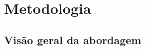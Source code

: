 %
%

\section{Metodologia}
\label{sec:metodologia}

\subsection{Visão geral da abordagem}
\label{sec:metodologia-visao}

